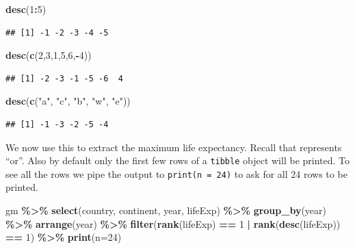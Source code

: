 \documentclass[
]{krantz}
\newenvironment{Shaded}{\begin{snugshade}}{\end{snugshade}}
\newcommand{\DataTypeTok}[1]{\textcolor[rgb]{0.13,0.29,0.53}{#1}}
\newcommand{\DecValTok}[1]{\textcolor[rgb]{0.00,0.00,0.81}{#1}}
\newcommand{\KeywordTok}[1]{\textcolor[rgb]{0.13,0.29,0.53}{\textbf{#1}}}
\newcommand{\NormalTok}[1]{#1}
\newcommand{\OperatorTok}[1]{\textcolor[rgb]{0.81,0.36,0.00}{\textbf{#1}}}
\newcommand{\StringTok}[1]{\textcolor[rgb]{0.31,0.60,0.02}{#1}}
\begin{document}
\begin{Shaded}
\begin{Highlighting}[]
\KeywordTok{desc}\NormalTok{(}\DecValTok{1}\OperatorTok{:}\DecValTok{5}\NormalTok{)}
\end{Highlighting}
\end{Shaded}

\begin{verbatim}
## [1] -1 -2 -3 -4 -5
\end{verbatim}

\begin{Shaded}
\begin{Highlighting}[]
\KeywordTok{desc}\NormalTok{(}\KeywordTok{c}\NormalTok{(}\DecValTok{2}\NormalTok{,}\DecValTok{3}\NormalTok{,}\DecValTok{1}\NormalTok{,}\DecValTok{5}\NormalTok{,}\DecValTok{6}\NormalTok{,}\OperatorTok{{-}}\DecValTok{4}\NormalTok{))}
\end{Highlighting}
\end{Shaded}

\begin{verbatim}
## [1] -2 -3 -1 -5 -6  4
\end{verbatim}

\begin{Shaded}
\begin{Highlighting}[]
\KeywordTok{desc}\NormalTok{(}\KeywordTok{c}\NormalTok{(}\StringTok{"a"}\NormalTok{, }\StringTok{"c"}\NormalTok{, }\StringTok{"b"}\NormalTok{, }\StringTok{"w"}\NormalTok{, }\StringTok{"e"}\NormalTok{))}
\end{Highlighting}
\end{Shaded}

\begin{verbatim}
## [1] -1 -3 -2 -5 -4
\end{verbatim}

We now use this to extract the maximum life expectancy. Recall that \texttt{\textbar{}} represents ``or''. Also by default only the first few rows of a \texttt{tibble} object will be printed. To see all the rows we pipe the output to \texttt{print(n\ =\ 24)} to ask for all 24 rows to be printed.

\begin{Shaded}
\begin{Highlighting}[]
\NormalTok{gm }\OperatorTok{\%\textgreater{}\%}\StringTok{ }
\StringTok{  }\KeywordTok{select}\NormalTok{(country, continent, year, lifeExp) }\OperatorTok{\%\textgreater{}\%}\StringTok{ }
\StringTok{  }\KeywordTok{group\_by}\NormalTok{(year) }\OperatorTok{\%\textgreater{}\%}\StringTok{ }
\StringTok{  }\KeywordTok{arrange}\NormalTok{(year) }\OperatorTok{\%\textgreater{}\%}\StringTok{ }
\StringTok{  }\KeywordTok{filter}\NormalTok{(}\KeywordTok{rank}\NormalTok{(lifeExp) }\OperatorTok{==}\StringTok{ }\DecValTok{1} \OperatorTok{|}\StringTok{ }\KeywordTok{rank}\NormalTok{(}\KeywordTok{desc}\NormalTok{(lifeExp)) }\OperatorTok{==}\StringTok{ }\DecValTok{1}\NormalTok{) }\OperatorTok{\%\textgreater{}\%}\StringTok{ }
\StringTok{  }\KeywordTok{print}\NormalTok{(}\DataTypeTok{n=}\DecValTok{24}\NormalTok{)}
\end{Highlighting}
\end{Shaded}
\end{document}
